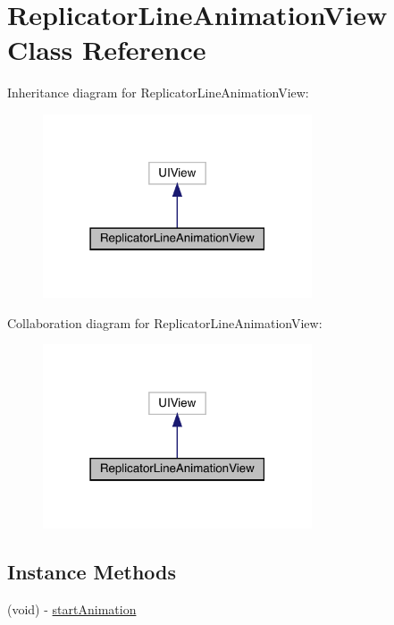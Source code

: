 \hypertarget{interface_replicator_line_animation_view}{}\section{Replicator\+Line\+Animation\+View Class Reference}
\label{interface_replicator_line_animation_view}


Inheritance diagram for Replicator\+Line\+Animation\+View\+:\nopagebreak
\begin{figure}[H]
\begin{center}
\leavevmode
\includegraphics[width=226pt]{interface_replicator_line_animation_view__inherit__graph}
\end{center}
\end{figure}


Collaboration diagram for Replicator\+Line\+Animation\+View\+:\nopagebreak
\begin{figure}[H]
\begin{center}
\leavevmode
\includegraphics[width=226pt]{interface_replicator_line_animation_view__coll__graph}
\end{center}
\end{figure}
\subsection*{Instance Methods}
\begin{DoxyCompactItemize}
\item 
(void) -\/ \mbox{\hyperlink{interface_replicator_line_animation_view_a2eee6cbda6826b2d93d448d06fcd5353}{start\+Animation}}
\end{DoxyCompactItemize}
